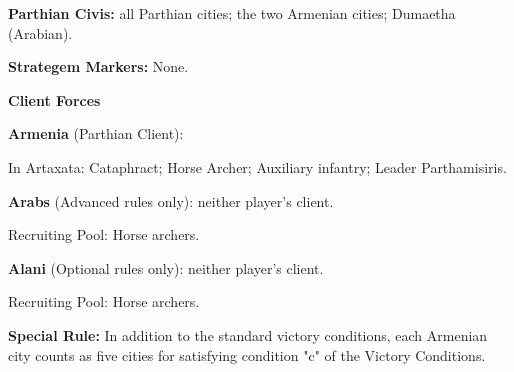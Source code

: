 \textbf{Parthian Civis:} all Parthian cities; the two Armenian cities; Dumaetha (Arabian).

\textbf{Strategem Markers:} None.

\textbf{Client Forces}

\textbf{Armenia} (Parthian Client):

In Artaxata: Cataphract; Horse Archer; Auxiliary infantry; Leader Parthamisiris.

\textbf{Arabs} (Advanced rules only): neither player's client.

Recruiting Pool: Horse archers.

\textbf{Alani} (Optional rules only): neither player's client.

Recruiting Pool: Horse archers.

\textbf{Special Rule:} In addition to the standard victory conditions, each Armenian city counts as five cities for satisfying condition "c" of the Victory Conditions.